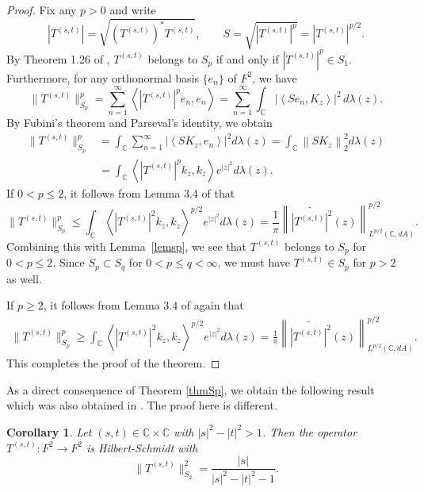 \documentclass[reqno]{amsart}
\newtheorem{corollary}[theorem]{Corollary}
\newcommand{\C}{{\mathbb C}}
\newcommand{\inc}{\int_{\C}}
\begin{document}
\begin{proof}
Fix any $p>0$ and write
$$\left|T^{(s,t)}\right|=\sqrt{\left(T^{(s,t)}\right)^*T^{(s,t)}},\qquad
S=\sqrt{\left|T^{(s,t)}\right|^{{p}}}=\left|T^{(s,t)}\right|^{p/2}.$$
By Theorem 1.26 of \cite{Zhu2}, $T^{(s,t)}$ belongs to $S_p$
if and only if $\left|T^{(s,t)}\right|^{p}\in{S_1}$. Furthermore, for
any orthonormal basis $\{e_n\}$ of $F^2$, we have
$$\|T^{(s,t)}\|_{S_p}^p=\sum_{n=1}^\infty\left \langle \left|T^{(s,t)}
\right|^{p} e_n,e_n\right\rangle=\sum_{n=1}^\infty\inc\left|
\left\langle S e_n,K_z\right\rangle\right|^2\,d\lambda(z).$$
By Fubini's theorem and Parseval's identity, we obtain
\begin{align*}
\|T^{(s,t)}\|_{S_p}^p&=\inc \sum_{n=1}^\infty
\left|\left \langle S K_z, e_n\right\rangle\right|^2d\lambda(z)
=\inc\left\|SK_z\right\|_2^2d\lambda(z)\\
&=\inc\left\langle\left|T^{(s,t)}\right|^{p} k_z,k_z\right\rangle
e^{|z|^2}d\lambda(z).
\end{align*}
If $0< p\leq2$, it follows from Lemma 3.4 of \cite{Zhu1} that
$$\|T^{(s,t)}\|_{S_p}^p\leq\inc\left\langle \left|T^{(s,t)}
\right|^2 k_z,k_z\right\rangle^{p/2} e^{|z|^2}d\lambda(z)
=\frac{1}{\pi}\left\|\widetilde{\left|T^{(s,t)}\right|^2}(z)
\right\|_{L^{{p}/{2}}(\mathbb{C},dA)}^{{p}/{2}}.$$
Combining this with Lemma~\ref{lemsp}, we see that $T^{(s,t)}$
belongs to $S_p$ for $0< p\leq2$. Since $S_p\subset S_q$ for
$0<p\le q<\infty$, we must have $T^{(s,t)}\in S_p$ for $p>2$
as well.

If $p\geq2$, it follows from Lemma 3.4 of \cite{Zhu1} again that
\begin{align*}
\|T^{(s,t)}\|_{S_p}^p\geq\inc\left\langle\left|T^{(s,t)}
\right|^2 k_z,k_z\right\rangle^{p/2}e^{|z|^2}d\lambda(z)
=\frac{1}{\pi}\left\|\widetilde{\left|T^{(s,t)}\right|^2}(z)
\right\|_{L^{{p}/{2}}(\C,dA)}^{{p}/{2}}.
\end{align*}
This completes the proof of the theorem.
\end{proof}

As a direct consequence of Theorem \ref{thmSp}, we obtain
the following result which was also obtained in \cite{DZ3}. The
proof here is different.

\begin{corollary}\label{corS2}
Let $(s, t)\in\C\times\C$ with $|s|^2-|t|^2>1$. Then the operator
$T^{(s,t)}: F^2\to F^2$ is Hilbert-Schmidt with
$$\|T^{(s,t)}\|_{S_2}^2=\frac{|s|}{{|s|^2-|t|^2-1}}.$$
\end{corollary}
\end{document}
